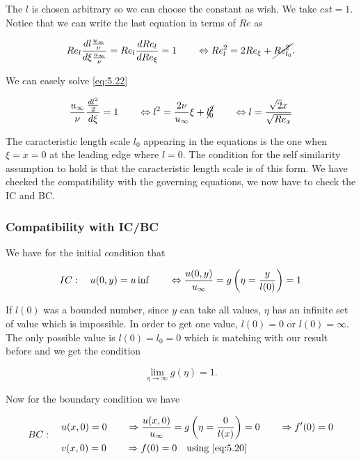 			The $l$ is chosen arbitrary so we can choose the constant as wish. We take $cst = 1$. Notice that we can write the last equation in terms of $Re$ as 
			
			\begin{equation}
				Re_l \frac{dl \frac{u_\infty}{\nu}}{d\xi \frac{u_\infty}{\nu}} = Re_l \frac{dRe_l}{dRe_\xi} = 1 \qquad \Leftrightarrow Re_l^2 = 2 Re_\xi + \cancel{Re_{l_0}^2}.
				\label{eq:5.23}
			\end{equation}
			
			We can easely solve \eqref{eq:5.22}
			
			\begin{equation}
				\frac{u_\infty}{\nu}\frac{\frac{dl^2}{2}}{d\xi} = 1 \qquad \Leftrightarrow l^2 = \frac{2\nu}{u_\infty} \xi + \cancel{l_0^2} \qquad \Leftrightarrow l = \frac{\sqrt{2}x}{\sqrt{Re_x}}
			\end{equation}
			
			The caracteristic length scale $l_0$ appearing in the equations is the one when $\xi = x = 0$ at the leading edge where $l = 0$. The condition for the self similarity assumption to hold is that the caracteristic length scale is of this form. We have checked the compatibility with the governing equations, we now have to check the IC and BC. 
			
		\subsubsection{Compatibility with IC/BC}
			We have for the initial condition that
			
			\begin{equation}
				IC: \quad u(0,y) = u\inf \qquad \Leftrightarrow \frac{u(0,y)}{u_\infty} = g\left(\eta = \frac{y}{l(0)}\right)=1
			\end{equation}
			
			If $l(0)$ was a bounded number, since $y$ can take all values, $\eta$ has an infinite set of value which is impossible. In order to get one value, $l(0) = 0$ or $l(0) = \infty$. The only possible value is $l(0) = l_0 = 0$ which is matching with our result before and we get the condition 
			
			\begin{equation}
				\lim _{\eta \rightarrow \infty} g(\eta) = 1.
			\end{equation}
			
			Now for the boundary condition we have 
			
			\begin{equation}
			BC: 	\quad		
			\begin{aligned}
				&u(x,0) = 0 \qquad \Rightarrow \frac{u(x,0)}{u_\infty} = g\left(\eta =\frac{0}{l(x)}\right) = 0 \qquad \Rightarrow f'(0) = 0\\
				&v(x,0) = 0 \qquad \Rightarrow f(0) = 0 \quad \mbox{using } \eqref{eq:5.20}
			\end{aligned}
			\end{equation}
			
